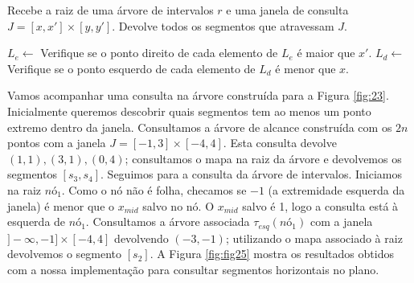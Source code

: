 \begin{algorithm}[h!]
    \caption{Recebe a raiz de uma árvore de intervalos $r$ e uma janela de consulta $J=[x,x']\times[y, y']$. Devolve todos os segmentos que atravessam  $J$.}
    \begin{algorithmic}[1]
                    \State $L_e\leftarrow$\Call{BuscaEmAlcance2D}{$\tau_{esq}(r)$ , $]-\infty, x] \times [y, y']$}
                    \State Verifique se o ponto direito de cada elemento de $L_e$ é maior que $x'$.
                    \State {}
                \Else
                    \State $L_d\leftarrow$ \Call{BuscaEmAlcance2D}{$\tau_{dir}(r)$ , $[x', \infty [ \times [y, y']$}
                    \State Verifique se o ponto esquerdo de cada elemento de $L_d$ é menor que $x$.
                    \State {}
                \EndIf
            \EndIf
        \EndFunction
    \end{algorithmic}
\end{algorithm}

Vamos acompanhar uma consulta na árvore construída para a Figura \ref{fig:23}. Inicialmente queremos descobrir quais segmentos tem ao menos um ponto extremo dentro da janela. Consultamos a árvore de alcance construída com os $2n$ pontos com a janela $J=[-1,3]\times[-4,4]$. Esta consulta devolve $(1,1), (3,1), (0,4)$; consultamos o mapa na raiz da árvore e devolvemos os segmentos $[s_3, s_4]$. Seguimos para a consulta da árvore de intervalos. Iniciamos na raiz $nó_1$. Como o nó não é folha, checamos se $-1$ (a extremidade esquerda da janela) é menor que o $x_{mid}$ salvo no nó. O $x_{mid}$ salvo é 1, logo a consulta está à esquerda de $nó_1$. Consultamos a árvore associada $\tau_{esq}(nó_1)$ com a janela  $]-\infty, -1] \times [-4, 4]$ devolvendo $(-3, -1)$; utilizando o mapa associado à raiz devolvemos o segmento $[s_2]$.
A Figura \ref{fig:fig25} mostra os resultados obtidos com a nossa implementação para consultar segmentos horizontais no plano.

